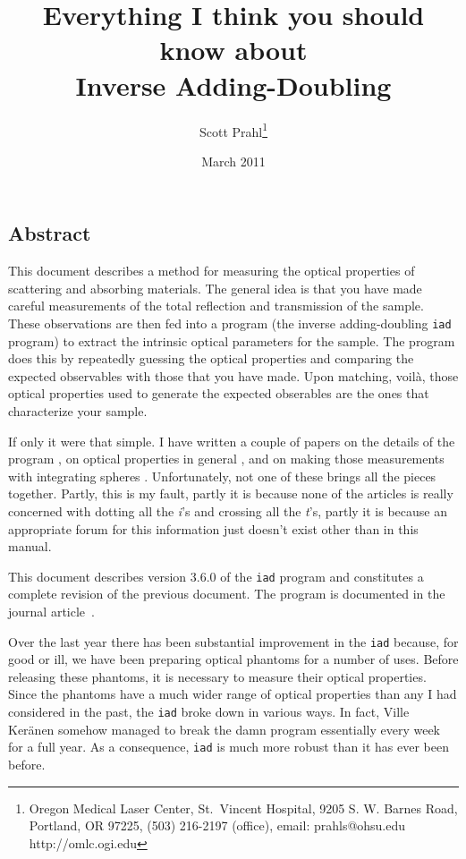 \documentclass{article}
\newcommand\iadprog{\texttt{iad}}
\begin{document}
\title{Everything I think you should know about \\
Inverse Adding-Doubling}
\author{
	Scott Prahl\thanks{Oregon Medical Laser Center,
	            St.\ Vincent Hospital,
	            9205 S. W. Barnes Road,
	            Portland, OR 97225,
	            (503) 216-2197 (office),
	            email: prahls@ohsu.edu
	            http://omlc.ogi.edu}	
}
\date{March 2011}	

\maketitle

\subsection*{Abstract}  
This document describes a method for measuring the optical properties of
scattering and absorbing materials.  The general idea is that you have made 
careful measurements of the total
reflection and transmission of the sample.  These observations are then fed into
a program (the inverse adding-doubling \iadprog{} program) to extract the intrinsic
optical parameters for the sample.   The program does this by repeatedly guessing
the optical properties and comparing the expected observables with those that you
have made.  Upon matching, voil\`a, those optical properties used to generate the
expected obserables are the ones that characterize your sample.

If only it were that simple.  I have written a couple of papers on the details of
the program \cite{jacques87a,prahl93a,moffitt06a}, on optical properties in general
\cite{cheong90a}, and on making those measurements with integrating spheres
\cite{pickering92,pickering93a}.  Unfortunately, not one of these brings all the
pieces together.  Partly, this is my fault, partly it is because none of the
articles is really concerned with dotting all the \textit{i}'s and crossing all
the \textit{t}'s, partly it is because an appropriate forum for this information
just doesn't exist other than in this manual.

This document describes version 3.6.0 of the \iadprog{} program and constitutes
a complete revision of the previous document.  The program is documented in the
journal article~\cite{moffitt07a}.

Over the last year there has been substantial improvement in the \iadprog{} because,
for good or ill, we have been preparing optical phantoms for a number of uses.
Before releasing these phantoms, it is necessary to measure their optical properties.
Since the phantoms have a much wider range of optical properties than any I had
considered in the past, the \iadprog{} broke down in various ways.  In fact, Ville
Ker{\"a}nen somehow managed to break the damn program essentially every week for a
full year.  As a consequence, \iadprog{} is much more robust than it has ever been before.
\end{document}
